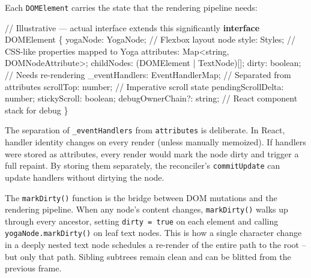 \documentclass[
  english,
  11pt,
  letterpaper,
]{book}
\newenvironment{Shaded}{\begin{snugshade}}{\end{snugshade}}
\newcommand{\BuiltInTok}[1]{\textcolor[rgb]{0.00,0.23,0.31}{#1}}
\newcommand{\CommentTok}[1]{\textcolor[rgb]{0.37,0.37,0.37}{#1}}
\newcommand{\DataTypeTok}[1]{\textcolor[rgb]{0.68,0.00,0.00}{#1}}
\newcommand{\KeywordTok}[1]{\textcolor[rgb]{0.00,0.23,0.31}{\textbf{#1}}}
\newcommand{\NormalTok}[1]{\textcolor[rgb]{0.00,0.23,0.31}{#1}}
\newcommand{\OperatorTok}[1]{\textcolor[rgb]{0.37,0.37,0.37}{#1}}
\begin{document}
Each \texttt{DOMElement} carries the state that the rendering pipeline
needs:

\begin{Shaded}
\begin{Highlighting}[]
\CommentTok{// Illustrative — actual interface extends this significantly}
\KeywordTok{interface}\NormalTok{ DOMElement \{}
\NormalTok{  yogaNode}\OperatorTok{:}\NormalTok{ YogaNode}\OperatorTok{;}           \CommentTok{// Flexbox layout node}
\NormalTok{  style}\OperatorTok{:}\NormalTok{ Styles}\OperatorTok{;}                \CommentTok{// CSS{-}like properties mapped to Yoga}
\NormalTok{  attributes}\OperatorTok{:} \BuiltInTok{Map}\OperatorTok{\textless{}}\DataTypeTok{string}\OperatorTok{,}\NormalTok{ DOMNodeAttribute}\OperatorTok{\textgreater{};}
\NormalTok{  childNodes}\OperatorTok{:}\NormalTok{ (DOMElement }\OperatorTok{|}\NormalTok{ TextNode)[]}\OperatorTok{;}
\NormalTok{  dirty}\OperatorTok{:} \DataTypeTok{boolean}\OperatorTok{;}               \CommentTok{// Needs re{-}rendering}
\NormalTok{  \_eventHandlers}\OperatorTok{:}\NormalTok{ EventHandlerMap}\OperatorTok{;} \CommentTok{// Separated from attributes}
\NormalTok{  scrollTop}\OperatorTok{:} \DataTypeTok{number}\OperatorTok{;}            \CommentTok{// Imperative scroll state}
\NormalTok{  pendingScrollDelta}\OperatorTok{:} \DataTypeTok{number}\OperatorTok{;}
\NormalTok{  stickyScroll}\OperatorTok{:} \DataTypeTok{boolean}\OperatorTok{;}
\NormalTok{  debugOwnerChain}\OperatorTok{?:} \DataTypeTok{string}\OperatorTok{;}     \CommentTok{// React component stack for debug}
\NormalTok{\}}
\end{Highlighting}
\end{Shaded}

The separation of \texttt{\_eventHandlers} from \texttt{attributes} is
deliberate. In React, handler identity changes on every render (unless
manually memoized). If handlers were stored as attributes, every render
would mark the node dirty and trigger a full repaint. By storing them
separately, the reconciler's \texttt{commitUpdate} can update handlers
without dirtying the node.

The \texttt{markDirty()} function is the bridge between DOM mutations
and the rendering pipeline. When any node's content changes,
\texttt{markDirty()} walks up through every ancestor, setting
\texttt{dirty\ =\ true} on each element and calling
\texttt{yogaNode.markDirty()} on leaf text nodes. This is how a single
character change in a deeply nested text node schedules a re-render of
the entire path to the root -- but only that path. Sibling subtrees
remain clean and can be blitted from the previous frame.
\end{document}
